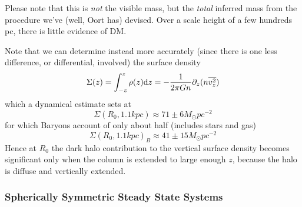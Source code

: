 Please note that this is \emph{not} the visible mass, but the \emph{total} inferred mass from the procedure we've (well, Oort has) devised. Over a scale height of a few hundreds pc, there is little evidence of DM.
\par Note that we can determine instead more accurately (since there is one less difference, or differential, involved) the surface density
\begin{equation*}
    \Sigma(z) = \int_{-z}^{z}\rho(z)\text{d}z = -\frac{1}{2\pi G n}\partial_{z}(n\overline{v_{z}^{2}})
\end{equation*}
which a dynamical estimate sets at
\begin{equation*}
    \Sigma(R_{0}, 1.1\unit{kpc}) \approx 71 \pm 6 M_{\odot}\unit{pc}^{-2}
\end{equation*}
for which Baryons account of only about half (includes stars and gas)
\begin{equation*}
      \Sigma(R_{0}, 1.1\unit{kpc})_{B} \approx 41 \pm 15 M_{\odot}\unit{pc}^{-2}
\end{equation*}
Hence at $R_{0}$ the dark halo contribution to the vertical surface density becomes significant only when the column is extended to large enough $z$, because the halo is diffuse and vertically extended.

\subsubsection*{Spherically Symmetric Steady State Systems}

